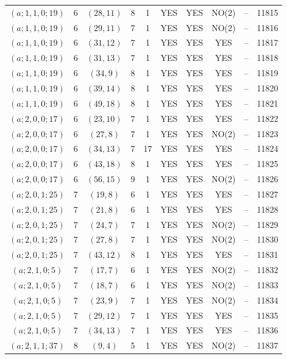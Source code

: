 \begin{longtable}{|c|c|c|c|c|c|c|c|c|c|}
$(a; 1, 1, 0; 19)$ & 6 & $(28, 11)$ & 8 & 1 & YES & YES & NO(2) & -- & 11815\\
$(a; 1, 1, 0; 19)$ & 6 & $(29, 11)$ & 7 & 1 & YES & YES & NO(2) & -- & 11816\\
$(a; 1, 1, 0; 19)$ & 6 & $(31, 12)$ & 7 & 1 & YES & YES & YES & -- & 11817\\
$(a; 1, 1, 0; 19)$ & 6 & $(31, 13)$ & 7 & 1 & YES & YES & YES & -- & 11818\\
$(a; 1, 1, 0; 19)$ & 6 & $(34, 9)$ & 8 & 1 & YES & YES & YES & -- & 11819\\
$(a; 1, 1, 0; 19)$ & 6 & $(39, 14)$ & 8 & 1 & YES & YES & YES & -- & 11820\\
$(a; 1, 1, 0; 19)$ & 6 & $(49, 18)$ & 8 & 1 & YES & YES & YES & -- & 11821\\
$(a; 2, 0, 0; 17)$ & 6 & $(23, 10)$ & 7 & 1 & YES & YES & YES & -- & 11822\\
$(a; 2, 0, 0; 17)$ & 6 & $(27, 8)$ & 7 & 1 & YES & YES & NO(2) & -- & 11823\\
$(a; 2, 0, 0; 17)$ & 6 & $(34, 13)$ & 7 & 17 & YES & YES & YES & -- & 11824\\
$(a; 2, 0, 0; 17)$ & 6 & $(43, 18)$ & 8 & 1 & YES & YES & YES & -- & 11825\\
$(a; 2, 0, 0; 17)$ & 6 & $(56, 15)$ & 9 & 1 & YES & YES & NO(2) & -- & 11826\\
$(a; 2, 0, 1; 25)$ & 7 & $(19, 8)$ & 6 & 1 & YES & YES & YES & -- & 11827\\
$(a; 2, 0, 1; 25)$ & 7 & $(21, 8)$ & 6 & 1 & YES & YES & YES & -- & 11828\\
$(a; 2, 0, 1; 25)$ & 7 & $(24, 7)$ & 7 & 1 & YES & YES & NO(2) & -- & 11829\\
$(a; 2, 0, 1; 25)$ & 7 & $(27, 8)$ & 7 & 1 & YES & YES & NO(2) & -- & 11830\\
$(a; 2, 0, 1; 25)$ & 7 & $(43, 12)$ & 8 & 1 & YES & YES & YES & -- & 11831\\
$(a; 2, 1, 0; 5)$ & 7 & $(17, 7)$ & 6 & 1 & YES & YES & NO(2) & -- & 11832\\
$(a; 2, 1, 0; 5)$ & 7 & $(18, 7)$ & 6 & 1 & YES & YES & NO(2) & -- & 11833\\
$(a; 2, 1, 0; 5)$ & 7 & $(23, 9)$ & 7 & 1 & YES & YES & NO(2) & -- & 11834\\
$(a; 2, 1, 0; 5)$ & 7 & $(29, 12)$ & 7 & 1 & YES & YES & YES & -- & 11835\\
$(a; 2, 1, 0; 5)$ & 7 & $(34, 13)$ & 7 & 1 & YES & YES & YES & -- & 11836\\
$(a; 2, 1, 1; 37)$ & 8 & $(9, 4)$ & 5 & 1 & YES & YES & NO(2) & -- & 11837\\

\end{longtable}
